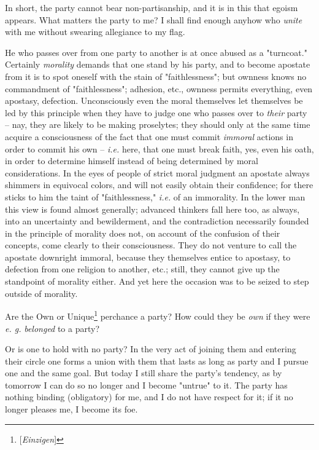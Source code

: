 In short, the party cannot bear non-partisanship, and it is in this that 
egoism appears. What matters the party to me? I shall find enough anyhow who 
\textit{unite} with me without swearing allegiance to my flag.

He who passes over from one party to another is at once abused as a 
"{}turncoat."{} Certainly \textit{morality} demands that one stand by his 
party, and to become apostate from it is to spot oneself with the stain of 
"{}faithlessness"{}; but ownness knows no commandment of "{}faithlessness"{}; 
adhesion, etc., ownness permits everything, even apostasy, defection. 
Unconsciously even the moral themselves let themselves be led by this 
principle when they have to judge one who passes over to \textit{their} party 
-- nay, they are likely to be making proselytes; they should only at the same 
time acquire a consciousness of the fact that one must commit \textit{immoral} 
actions in order to commit his own -- \textit{i.e.} here, that one must break 
faith, yes, even his oath, in order to determine himself instead of being 
determined by moral considerations. In the eyes of people of strict moral 
judgment an apostate always shimmers in equivocal colors, and will not easily 
obtain their confidence; for there sticks to him the taint of 
"{}faithlessness,"{} \textit{i.e.} of an immorality. In the lower man this 
view is found almost generally; advanced thinkers fall here too, as always, 
into an uncertainty and bewilderment, and the contradiction necessarily 
founded in the principle of morality does not, on account of the confusion of 
their concepts, come clearly to their consciousness. They do not venture to 
call the apostate downright immoral, because they themselves entice to 
apostasy, to defection from one religion to another, etc.; still, they cannot 
give up the standpoint of morality either. And yet here the occasion was to be 
seized to step outside of morality.

Are the Own or Unique\footnote{[\textit{Einzigen}]} perchance a party? How 
could they be \textit{own} if they were \textit{e. g.} \textit{belonged} to a 
party?

Or is one to hold with no party? In the very act of joining them and entering 
their circle one forms a union with them that lasts as long as party and I 
pursue one and the same goal. But today I still share the party's tendency, as 
by tomorrow I can do so no longer and I become "{}untrue"{} to it. The party 
has nothing binding (obligatory) for me, and I do not have respect for it; if 
it no longer pleases me, I become its foe.

